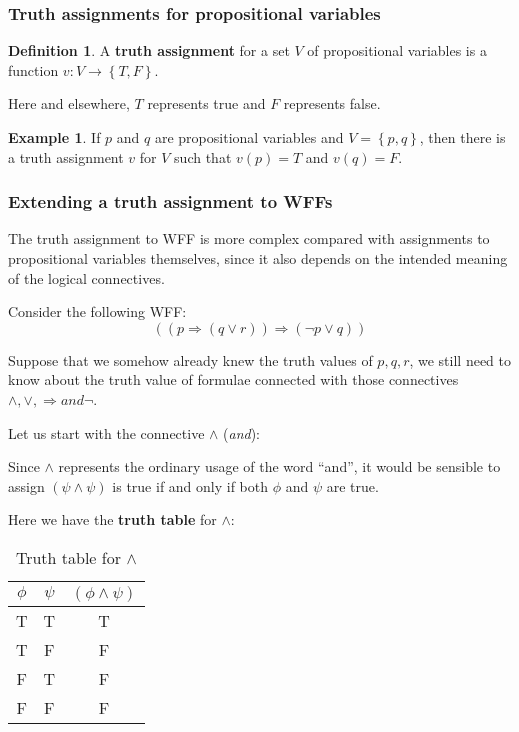 \documentclass[11pt]{article}
\theoremstyle{definition}
\newtheorem{defn}{Definition}[subsection]
\newtheorem{eg}{Example}
\begin{document}
\subsubsection{Truth assignments for propositional variables}
\begin{shaded}
\begin{defn}
    A \textbf{truth assignment} for a set $V$ of propositional variables is a function $v: V \rightarrow \left\{T,F\right\}$.
\end{defn}
\end{shaded}
Here and elsewhere, $T$ represents true and $F$ represents false.
\begin{eg}
    If $p$ and $q$ are propositional variables and $V = \left\{p,q\right\}$, then there is a truth assignment $v$ for $V$ such that $v(p)=T$ and $v(q)=F$.
\end{eg}

\subsubsection{Extending a truth assignment to WFFs}
The truth assignment to WFF is more complex compared with assignments to propositional variables themselves, since it also depends on the intended meaning of the logical connectives.

Consider the following WFF:
\begin{equation}
    ((p \Rightarrow (q \vee r)) \Rightarrow (\neg p \vee q))
\end{equation}

Suppose that we somehow already knew the truth values of $p,q,r$, we still need to know about the truth value of formulae connected with those connectives $\wedge, \vee, \Rightarrow and \neg$.

Let us start with the connective $\wedge$ (\textit{and}):

Since $\wedge$ represents the ordinary usage of the word ``and'', it would be sensible to assign $(\psi \wedge \psi)$ is true if and only if both $\phi$ and $\psi$ are true.

Here we have the \textbf{truth table} for $\wedge$:
\begin{table}[H]
    \centering
    \begin{tabular}{|c|c|c|}
    \hline
    \textbf{$\phi$} & \textbf{$\psi$} & \textbf{$(\phi \wedge \psi)$} \\ \hline
    T          & T          & T          \\ \hline
    T          & F          & F          \\ \hline
    F          & T          & F          \\ \hline
    F          & F          & F          \\ \hline
    \end{tabular}
    \caption[]{Truth table for $\wedge$}
\end{table}
\end{document}
